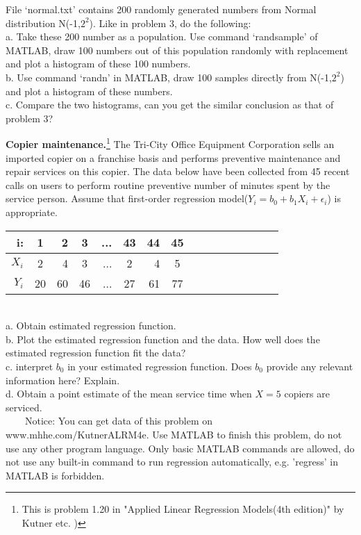\documentclass[12pt]{article}
\begin{document}
 { File `normal.txt' contains 200
randomly
generated numbers from Normal distribution N(-1,$2^2$). Like in problem 3, do the following: \\
a. Take these 200 number as a population. Use command `randsample'
of MATLAB, draw 100 numbers out of this population randomly with
replacement and plot a histogram of
these 100 numbers.\\
b. Use command `randn' in MATLAB, draw 100 samples directly from
N(-1,$2^2$) and plot a histogram of these numbers.\\
c. Compare the two histograms, can you get the similar conclusion as
that of problem 3?}
 { \vfill
  \answer
} { }



 { \textbf{Copier maintenance.}\footnote[1]{This is
problem 1.20 in "Applied Linear Regression Models(4th edition)" by
Kutner etc. )} The Tri-City Office Equipment Corporation sells an
imported copier on a franchise basis and performs preventive
maintenance and repair services on this copier. The data below have
been collected from 45 recent calls on users to perform routine
preventive number of minutes spent by the service person. Assume
that first-order regression model($Y_i=b_0+b_1 X_i+\epsilon_i$) is
appropriate.
\begin{table}[htdp]
\begin{center}
\begin{tabular}{rcrcrcrcrcrcrcrc}
\textbf{i:} &\textbf{1} &\textbf{2}& \textbf{3}&...&\textbf{43}&\textbf{44}&\textbf{45}\\
\hline \textbf{$X_i$} &2 &4 &3 &... &2 &4 &5\\
\textbf{$Y_i$} &20 &60 &46 &... &27 &61 &77
\end{tabular}
\end{center}
\end{table}\\

a. Obtain estimated regression function.\\
b. Plot the estimated regression function and the data. How well
does the estimated regression function fit the data?\\
c. interpret $b_0$ in your estimated regression function. Does $b_0$
provide any relevant information here? Explain.\\
d. Obtain a point estimate of the mean service time when $X=5$
copiers are serviced.\\
\indent~~~~Notice: You can get data of this problem on
www.mhhe.com/KutnerALRM4e. Use MATLAB to finish this problem, do not
use any other program language. Only basic MATLAB commands are
allowed, do not use any built-in command to run regression
automatically, e.g. 'regress' in MATLAB is forbidden. \\}
 { \vfill
  \answer
} { }



\problemsdone
\end{document}
